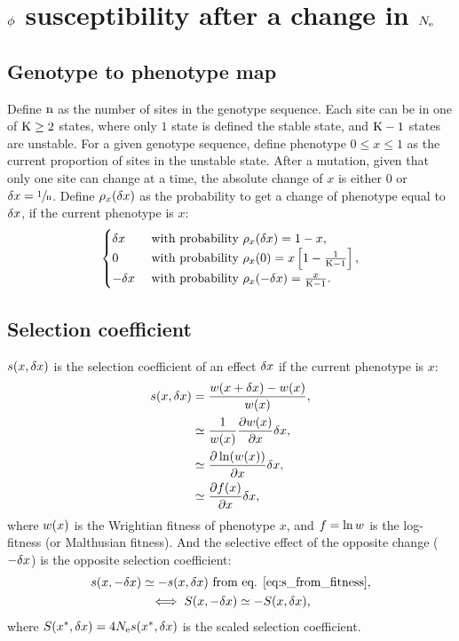 \section{\texorpdfstring{$\phi$}{φ} susceptibility after a change in \texorpdfstring{$N_{\mathrm{e}}$}{Nₑ}}
\subsection{Genotype to {phenotype} map}
Define $\text{n}$ as the number of sites in the genotype sequence.
Each site can be in one of $\text{K} \geq 2$ states, where only $1$ state is defined the stable state, and $\text{K} - 1$ states are unstable.
For a given genotype sequence, define phenotype $0 \leq x \leq 1$ as the current proportion of sites in the unstable state.
After a mutation, given that only one site can change at a time, the absolute change of $x$ is either $0$ or $\delta x=\sfrac{1}{\text{n}}$.
Define $\rho_{x}(\delta x)$ as the probability to get a change of phenotype equal to $\delta x$, if the current phenotype is $x$:\\
\begin{gather}
\begin{cases}
\delta x &\text{ with probability } \rho_{x}(\delta x) = 1-x, \\
0 &\text{ with probability } \rho_{x}(0) = x \left[1 - \frac{1}{\text{K} - 1}\right], \\
-\delta x &\text{ with probability } \rho_{x}(-\delta x) = \frac{x}{\text{K} - 1}.\\
\end{cases} \label{eq:proba-pheno}
\end{gather}
\subsection{Selection coefficient}
$s(x, \delta x)$ is the selection coefficient of an effect $\delta x$ if the current phenotype is $x$:
\begin{align}
s(x, \delta x) &= \frac{ w (x + \delta x) - w (x)}{ w ( x)}, \\
 &\simeq \frac{1}{ w (x)}\frac{ \partial w (x) }{\partial x} \delta x, \\
 &\simeq \frac{ \partial \ln (w (x))}{\partial x} \delta x, \\
 &\simeq \frac{ \partial f (x) }{\partial x} \delta x, \label{eq:s_from_fitness}
\end{align}
where $ w ( x)$ is the Wrightian fitness of phenotype $x$, and $ f  = \ln w$ is the log-fitness (or Malthusian fitness).
And the selective effect of the opposite change ($-\delta x$) is the opposite selection coefficient:
\begin{gather}
s(x, -\delta x) \simeq - s(x, \delta x) \text{ from eq. \ref{eq:s_from_fitness}} \label{eq:s_minus_deltax}, \\
\iff S(x, -\delta x) \simeq - S(x, \delta x), \label{eq:S_minus_deltax}
\end{gather}
where $S(x^{*}, \delta x) = 4N_{\mathrm{e}} s (x^{*}, \delta x)$ is the scaled selection coefficient.
